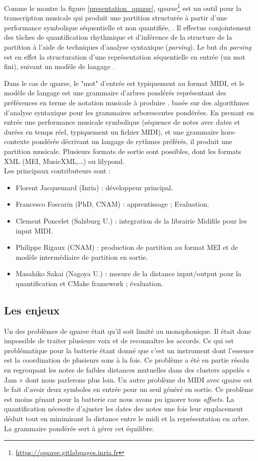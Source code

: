 Comme le montre la figure \ref{presentation_qparse}, qparse\footnote{
\url{https://qparse.gitlabpages.inria.fr}} est un outil pour la transcription
musicale qui produit une partition structurée à partir d'une performance symbolique séquentielle et non
quantifiée, . Il effectue conjointement des
tâches de quantification rhythmique et d'inférence de la structure de la
partition à l'aide de techniques d’analyse syntaxique (\textit{parsing}). Le
but du \textit{parsing} est en effet la structuration d'une représentation
séquentielle en entrée (un mot fini), suivant un modèle de langage
\cite{grune2007parsing}.

Dans le cas de qparse, le "mot" d'entrée est typiquement au format MIDI, et le
modèle de langage est une grammaire d'arbres pondérés représentant des
préférences en terme de notation musicale à produire \cite{droste2009handbook}.
basée sur des algorithmes d'analyse syntaxique pour les grammaires
arborescentes pondérées. En prenant en entrée une performance musicale
symbolique (séquence de notes avec dates et durées en temps réel, typiquement
un fichier MIDI), et une grammaire hors-contexte pondérée décrivant un langage
de rythmes préférés, il produit une partition musicale. Plusieurs formats de
sortie sont possibles, dont les formats XML (MEI, MusicXML,…) ou lilypond.\\

Les principaux contributeurs sont :
\begin{itemize}
	\item Florent Jacquemard (Inria) : développeur principal.
	\item Francesco Foscarin (PhD, CNAM) : apprentissage ; Evaluation.
	\item Clement Poncelet (Salzburg U.) : integration de la librairie Midifile
        pour les input MIDI.
	\item Philippe Rigaux (CNAM) : production de partition au format MEI et de
        modèle intermédiaire de partition en sortie.
	\item Masahiko Sakai (Nagoya U.) : mesure de la distance input/output pour
        la quantification et CMake framework ; évaluation.
\end{itemize}

\subsection*{Les enjeux}
Un des problèmes de qparse était qu’il soit limité au monophonique. Il était
donc impossible de traiter plusieurs voix et de reconnaître les accords. Ce qui
est problématique pour la batterie étant donné que c’est un instrument dont l’essence
est la coordination de plusieurs sons à la fois. Ce problème a été en partie résolu
en regroupant les notes de faibles distances mutuelles dans des clusters appelés
« Jam » dont nous parlerons plus loin.
Un autre problème du MIDI avec qparse est le fait d’avoir deux symboles en entrée
pour un seul généré en sortie. Ce problème est moins génant pour la batterie car
nous avons pu ignorer tous \textit{offsets}.
La quantification nécessite d’ajuster les dates des notes une fois leur emplacement
déduit tout en minimisant la distance entre le midi et la représentation en arbre. La grammaire pondérée sert à gérer cet équilibre.
